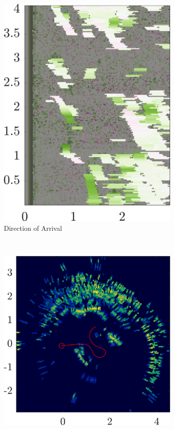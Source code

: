 \begin{figure}[htbp]
\begin{subfigure}[t]{0.32\linewidth}
        \includegraphics[width=\linewidth]{gfx/results/torturechamber_doa.png}
        \caption{\small Direction of Arrival}
    \end{subfigure}\\
    \begin{subfigure}[t]{0.475\textwidth}   
        \centering 
        \includegraphics[max width=\linewidth, max height=\linewidth]{gfx/results/torturechamber_reprojection.png}

\end{subfigure}
\end{figure}
